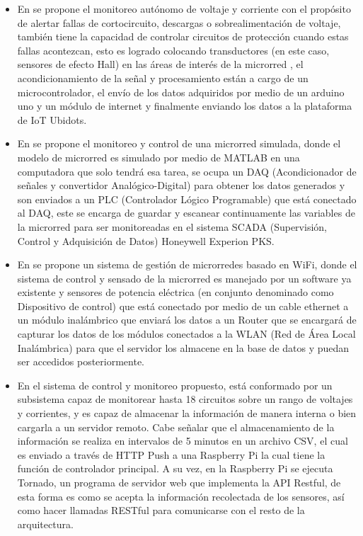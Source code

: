 \begin{itemize}
	\item En \citep{EstadoDelArte1} se propone el monitoreo autónomo de voltaje y corriente con el propósito de alertar fallas de cortocircuito, descargas o sobrealimentación de voltaje, también tiene la capacidad de controlar circuitos de protección cuando estas fallas acontezcan, esto es logrado colocando transductores (en este caso, sensores de efecto Hall) en las áreas de interés de la microrred , el acondicionamiento de la señal y procesamiento están a cargo de un microcontrolador, el envío de los datos adquiridos por medio de un arduino uno y un módulo de internet y finalmente enviando los datos a la plataforma de IoT Ubidots. 

    \item En \citep{EstadoDelArte2} se propone el monitoreo y control de una microrred simulada, donde el modelo de microrred es simulado por medio de MATLAB en una computadora que solo tendrá esa tarea, se ocupa un DAQ (Acondicionador de señales  y convertidor Analógico-Digital) para obtener los datos generados y son enviados a un PLC (Controlador Lógico Programable) que está conectado al DAQ, este se encarga de guardar y escanear continuamente las variables de la microrred para ser monitoreadas en el sistema SCADA (Supervisión, Control y Adquisición de Datos) Honeywell Experion PKS.

    \item En \citep{EstadoDelArte3} se propone un sistema de gestión de microrredes basado en WiFi, donde el sistema de control y sensado de la microrred es manejado por un software ya existente y sensores de potencia eléctrica (en conjunto denominado como Dispositivo de control) que está conectado por medio de un cable ethernet a un módulo inalámbrico que enviará los datos a un Router que se encargará de capturar los datos de los módulos conectados a la WLAN (Red de Área Local Inalámbrica) para que el servidor los almacene en la base de datos y puedan ser accedidos posteriormente. 

    \item En \citep{EstadoDelArte4} el sistema de control y monitoreo propuesto, está conformado por un subsistema capaz de monitorear hasta 18 circuitos sobre un rango de voltajes y corrientes, y es capaz de almacenar la información de manera interna o bien cargarla a un servidor remoto. Cabe señalar que el almacenamiento de la información se realiza en intervalos de 5 minutos en un archivo CSV, el cual es enviado a través de HTTP Push a una Raspberry Pi la cual tiene la función de controlador principal. A su vez, en la Raspberry Pi se ejecuta Tornado, un programa de servidor web que implementa la API Restful, de esta forma es como se acepta la información recolectada de los sensores, así como hacer llamadas RESTful para comunicarse con el resto de la arquitectura.
\end{itemize}
